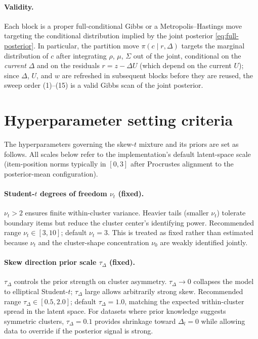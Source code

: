\documentclass[11pt]{article}
\begin{document}
\paragraph{Validity.}
Each block is a proper full-conditional Gibbs or a Metropolis--Hastings
move targeting the conditional distribution implied by the joint posterior
\eqref{eq:full-posterior}.  In particular, the partition move
$\pi(c\mid r,\Delta)$ targets the marginal distribution of $c$ after
integrating $\rho$, $\mu$, $\Sigma$ out of the joint, conditional on the
\emph{current} $\Delta$ and on the residuals $r=z-\Delta U$ (which depend
on the current $U$); since $\Delta$, $U$, and $w$ are refreshed in
subsequent blocks before they are reused, the sweep order
(1)--(15) is a valid Gibbs scan of the joint posterior.

\section{Hyperparameter setting criteria}
\label{sec:hyperparams}

The hyperparameters governing the skew-$t$ mixture and its priors are set
as follows.  All scales below refer to the implementation's default
latent-space scale (item-position norms typically in $[0,3]$ after
Procrustes alignment to the posterior-mean configuration).

\paragraph{Student-$t$ degrees of freedom $\nu_t$ (fixed).}
$\nu_t>2$ ensures finite within-cluster variance.  Heavier tails (smaller
$\nu_t$) tolerate boundary items but reduce the cluster center's
identifying power.  Recommended range $\nu_t\in[3,10]$; default
$\nu_t=3$.  This is treated as fixed rather than estimated because
$\nu_t$ and the cluster-shape concentration $\nu_0$ are weakly
identified jointly.

\paragraph{Skew direction prior scale $\tau_\Delta$ (fixed).}
$\tau_\Delta$ controls the prior strength on cluster asymmetry.
$\tau_\Delta\to 0$ collapses the model to elliptical Student-$t$;
$\tau_\Delta$ large allows arbitrarily strong skew.  Recommended range
$\tau_\Delta\in[0.5,2.0]$; default $\tau_\Delta=1.0$, matching the
expected within-cluster spread in the latent space.  For datasets where
prior knowledge suggests symmetric clusters, $\tau_\Delta=0.1$ provides
shrinkage toward $\Delta_l=0$ while allowing data to override if the
posterior signal is strong.
\end{document}

